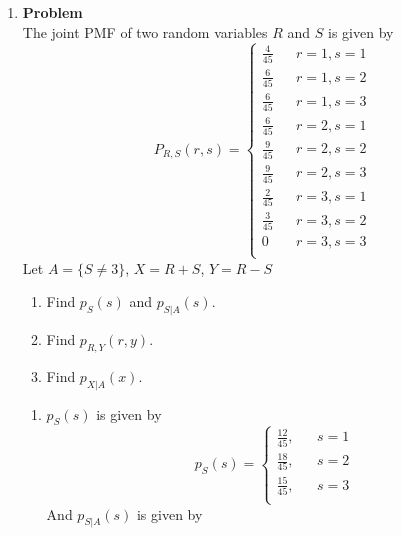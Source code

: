 \documentclass[12pt]{article}
\newenvironment{Ex}{\textbf{Problem}\vspace{.75em}\\}{}
\begin{document}
\begin{enumerate}
\begin{Ex}
\begin{solution}
\begin{enumerate}
      \end{enumerate}
    \end{solution}
  \end{Ex}
\item
  \begin{Ex}
    The joint PMF of two random variables $R$ and $S$ is given by
    \begin{equation*}
      \label{eq:3-question}
      P_{R,S}(r,s) = \left\{
        \begin{aligned}
          \frac{4}{45} && r=1, s=1 \\
          \frac{6}{45} && r=1, s=2 \\
          \frac{6}{45} && r=1, s=3 \\
          \frac{6}{45} && r=2, s=1 \\
          \frac{9}{45} && r=2, s=2 \\
          \frac{9}{45} && r=2, s=3 \\
          \frac{2}{45} && r=3, s=1 \\
          \frac{3}{45} && r=3, s=2 \\
          0 && r=3, s=3 \\
        \end{aligned} \right.
    \end{equation*}
    Let $A = \{S \not= 3\}$, $X = R+S$, $Y=R-S$
    \begin{enumerate}
    \item Find $p_S(s)$ and $p_{S|A}(s)$.
    \item Find $p_{R,Y}(r,y)$.
    \item Find $p_{X|A}(x)$.
    \end{enumerate}
    \begin{solution} \hfill
      \begin{enumerate}
      \item $p_S(s)$ is given by
        \begin{equation}
          \label{eq:3a-pmf-s}
          p_S(s) = \left\{
            \begin{aligned}
              \frac{12}{45}, && s=1 \\
              \frac{18}{45}, && s=2 \\
              \frac{15}{45}, && s=3 \\
            \end{aligned} \right.
        \end{equation}
        And $p_{S|A}(s)$ is given by
        \begin{equation}

\end{equation}
\end{enumerate}
\end{solution}
\end{Ex}
\end{enumerate}
\end{document}
